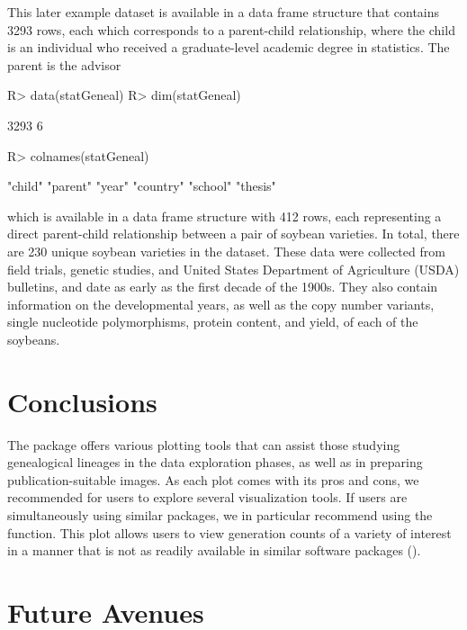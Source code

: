\documentclass[article,shortnames]{jss}
\begin{document}
This later example dataset is available in a data frame structure that contains 3293 rows, each which corresponds to a parent-child relationship, where the child is an individual who received a graduate-level academic degree in statistics. The parent is the advisor 



\begin{CodeChunk}
\begin{CodeInput}
R> data(statGeneal)
R> dim(statGeneal)
\end{CodeInput}
\begin{CodeOutput}
[1] 3293    6
\end{CodeOutput}
\begin{CodeInput}
R> colnames(statGeneal)
\end{CodeInput}
\begin{CodeOutput}
[1] "child"   "parent"  "year"    "country" "school"  "thesis"
\end{CodeOutput}
\end{CodeChunk}

which is available in a data frame structure with 412 rows, each representing a direct parent-child relationship between a pair of soybean varieties. In total, there are 230 unique soybean varieties in the dataset. These data were collected from field trials, genetic studies, and United States Department of Agriculture (USDA) bulletins, and date as early as the first decade of the 1900s. They also contain information on the developmental years, as well as the copy number variants, single nucleotide polymorphisms, protein content, and yield, of each of the soybeans.


\section{Conclusions}

The  package offers various plotting tools that can assist those studying genealogical lineages in the data exploration phases, as well as in preparing publication-suitable images. As each plot comes with its pros and cons, we recommended for users to explore several visualization tools. If users are simultaneously using similar packages, we in particular recommend using the  function. This plot allows users to view generation counts of a variety of interest in a manner that is not as readily available in similar software packages (\citealt{ape}).

\section{Future Avenues}
\end{document}

